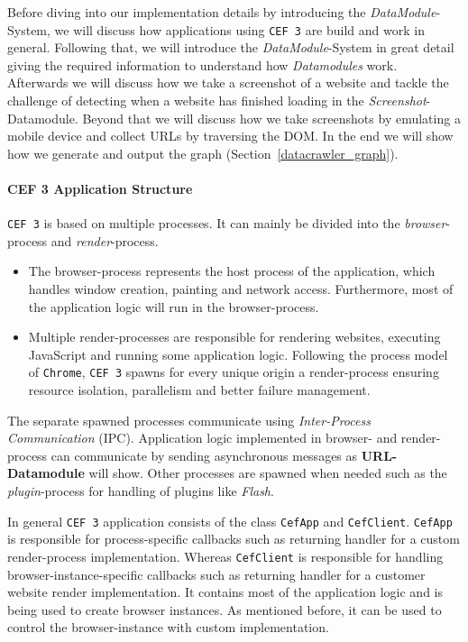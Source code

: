 Before diving into our implementation details by introducing the \textit{DataModule}-System, we will discuss how applications using \texttt{CEF 3} are build and work in general. Following that, we will introduce the \textit{DataModule}-System in great detail giving the required information to understand how \textit{Datamodules} work. Afterwards we will discuss how we take a screenshot of a website and tackle the challenge of detecting when a website has finished loading in the \textit{Screenshot}-Datamodule. Beyond that we will discuss how we take screenshots by emulating a mobile device and collect URLs by traversing the DOM. In the end we will show how we generate and output the graph (Section~\ref{datacrawler_graph}).

\paragraph*{CEF 3 Application Structure}
\label{datacrawler_cef_architecture}
\texttt{CEF 3} is based on multiple processes. It can mainly be divided into the \textit{browser}-process and \textit{render}-process.

\begin{itemize}
	\item The browser-process represents the host process of the application, which handles window creation, painting and network access. Furthermore, most of the application logic will run in the browser-process. 
	\item Multiple render-processes are responsible for rendering websites, executing JavaScript and running some application logic. Following the process model of \texttt{Chrome}, \texttt{CEF 3} spawns for every unique origin a render-process ensuring resource isolation, parallelism and better failure management.
\end{itemize}

The separate spawned processes communicate using \textit{Inter-Process Communication} (IPC). Application logic implemented in browser- and render-process can communicate by sending asynchronous messages as \textbf{URL-Datamodule} will show. Other processes are spawned when needed such as the \textit{plugin}-process for handling of plugins like \textit{Flash}.

In general \texttt{CEF 3} application consists of the class \texttt{CefApp} and \texttt{CefClient}. \texttt{CefApp} is responsible for process-specific callbacks such as returning handler for a custom render-process implementation. Whereas \texttt{CefClient} is responsible for handling browser-instance-specific callbacks such as returning handler for a customer website render implementation. It contains most of the application logic and is being used to create browser instances. As mentioned before, it can be used to control the browser-instance with custom implementation.

